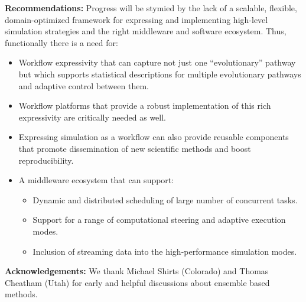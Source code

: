 \documentclass[10pt,letterpaper,draft]{article}
\begin{document}
\newpage

{\noindent \bf Recommendations:} Progress will be stymied by the lack of a scalable,
flexible, domain-optimized framework for expressing and implementing high-level
simulation strategies and the right middleware and software ecosystem. Thus,
functionally there is a need for:
\begin{itemize}
\item Workflow expressivity that can capture not just one ``evolutionary'' pathway but which supports statistical descriptions for multiple evolutionary pathways and adaptive control between them. 
\item Workflow platforms that provide a robust implementation of this rich expressivity are critically needed as well.
\item Expressing simulation as a workflow can also provide reusable components that promote dissemination of new scientific methods and boost reproducibility.
\item A middleware ecosystem that can support:
\begin{itemize} 
\item Dynamic and distributed scheduling of large number of concurrent tasks.
\item Support for a range of computational steering and adaptive execution modes.
\item Inclusion of streaming data into  the high-performance simulation modes.
\end{itemize}
\end{itemize}

{\noindent \bf Acknowledgements:} We thank Michael Shirts (Colorado) and Thomas Cheatham
(Utah) for early and helpful discussions about ensemble based methods.


\setcounter{page}{1} \pagestyle{plain} 


\end{document}
